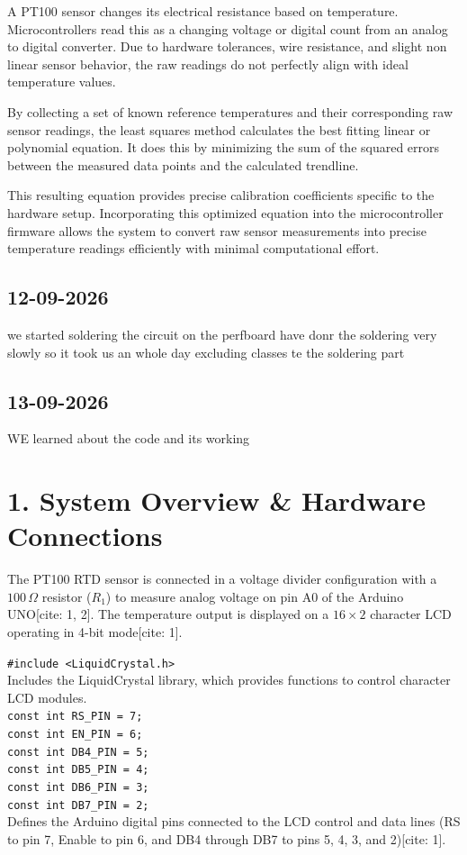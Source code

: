 \documentclass[12pt, a4paper]{article}
\begin{document}
	A PT100 sensor changes its electrical resistance based on temperature. Microcontrollers read this as a changing voltage or digital count from an analog to digital converter. Due to hardware tolerances, wire resistance, and slight non linear sensor behavior, the raw readings do not perfectly align with ideal temperature values.
	
	By collecting a set of known reference temperatures and their corresponding raw sensor readings, the least squares method calculates the best fitting linear or polynomial equation. It does this by minimizing the sum of the squared errors between the measured data points and the calculated trendline.
	
	This resulting equation provides precise calibration coefficients specific to the hardware setup. Incorporating this optimized equation into the microcontroller firmware allows the system to convert raw sensor measurements into precise temperature readings efficiently with minimal computational effort.
	\subsection{12-09-2026} we started soldering the circuit on the perfboard have donr the soldering very slowly so it took us an whole day excluding classes te the soldering part
	\subsection{13-09-2026}
	WE learned about the code and its working
	\section*{1. System Overview \& Hardware Connections}
	
	The PT100 RTD sensor is connected in a voltage divider configuration with a $100\,\Omega$ resistor ($R_1$) to measure analog voltage on pin A0 of the Arduino UNO[cite: 1, 2]. The temperature output is displayed on a $16 \times 2$ character LCD operating in 4-bit mode[cite: 1].
	
	\noindent\texttt{\#include <LiquidCrystal.h>}\\
	Includes the LiquidCrystal library, which provides functions to control character LCD modules.
	\\[6pt]
	
	\noindent\texttt{const int RS\_PIN = 7;}\\
	\texttt{const int EN\_PIN = 6;}\\
	\texttt{const int DB4\_PIN = 5;}\\
	\texttt{const int DB5\_PIN = 4;}\\
	\texttt{const int DB6\_PIN = 3;}\\
	\texttt{const int DB7\_PIN = 2;}\\
	Defines the Arduino digital pins connected to the LCD control and data lines (RS to pin 7, Enable to pin 6, and DB4 through DB7 to pins 5, 4, 3, and 2)[cite: 1].
	\\[6pt]
	
\end{document}
